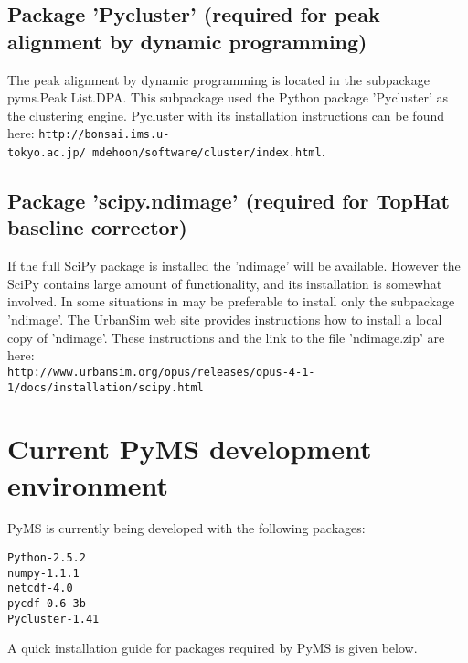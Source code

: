 \subsection{\label{subsec:pycluster}Package 'Pycluster' (required for peak
alignment by dynamic programming)}

The peak alignment by dynamic programming is located in the subpackage
pyms.Peak.List.DPA. This subpackage used the Python package 'Pycluster'
as the clustering engine. Pycluster with its installation instructions
can be found here:
{\tt http://bonsai.ims.u-tokyo.ac.jp/~mdehoon/software/cluster/index.html}.

\subsection{\label{subsec:scipy-ndmage}Package 'scipy.ndimage' (required
for TopHat baseline corrector)}

If the full SciPy package is installed the 'ndimage' will be available. However
the SciPy contains large amount of functionality, and its installation is
somewhat involved. In some situations in may be preferable to install only
the subpackage 'ndimage'. The UrbanSim web site \cite{urbansim} provides
instructions how to install a local copy of 'ndimage'. These instructions
and the link to the file 'ndimage.zip' are here:\\
{\tt http://www.urbansim.org/opus/releases/opus-4-1-1/docs/installation/scipy.html}

\section{Current PyMS development environment}

PyMS is currently being developed with the following packages:

\begin{verbatim}
Python-2.5.2
numpy-1.1.1
netcdf-4.0
pycdf-0.6-3b
Pycluster-1.41
\end{verbatim}

A quick installation guide for packages required by PyMS is given below.

